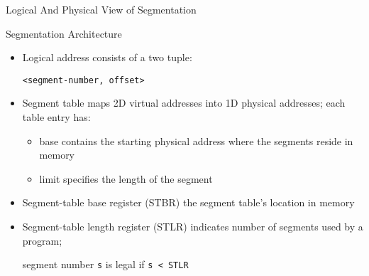 
\begin{frame}{Logical And Physical View of Segmentation}
  \begin{center}
  \end{center}
\end{frame}

\begin{frame}{Segmentation Architecture}
  \begin{itemize}
  \item Logical address consists of a \alert{two tuple}:
    \begin{center}
      \texttt{<segment-number, offset>}
    \end{center}
  \item \alert{Segment table} maps 2D virtual addresses into 1D physical
    addresses; each table entry has:
    \begin{itemize}
    \item \alert{base} contains the starting physical address where the segments
      reside in memory
    \item \alert{limit} specifies the length of the segment
    \end{itemize}
  \item \alert{Segment-table base register (STBR)} {\pright} the segment table's
    location in memory
  \item \alert{Segment-table length register (STLR)} indicates number of
    segments used by a program;
    \begin{center}
      segment number \texttt{s} is legal if \texttt{s < STLR}
    \end{center}
  \end{itemize}
\end{frame}

